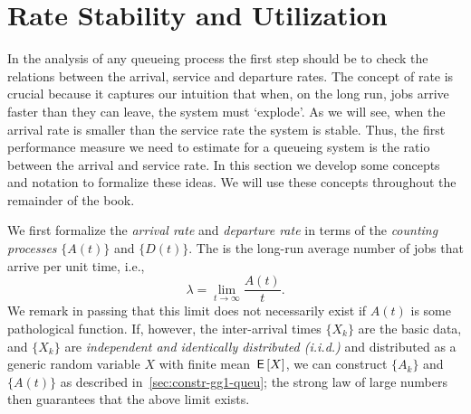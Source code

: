 \section{Rate Stability and Utilization}
\label{sec:rate-stability}



In the analysis of any queueing process the first step should be to check the relations between the arrival, service and departure rates.
The concept of rate is crucial because it captures our intuition that when, on the long run, jobs arrive faster than they can leave, the system must `explode'.
As we will see, when the arrival rate is smaller than the service rate the system is stable.
Thus, the first performance measure we need to estimate for a queueing system is the ratio between the arrival and service rate.
In this section we develop some concepts and notation to formalize these ideas.
We will use these concepts throughout the remainder of the book.

We first formalize the \emph{arrival rate} and \emph{departure rate} in terms of the \emph{counting processes} $\{A(t)\}$ and $\{D(t)\}$.
The  is the long-run average number of jobs that arrive per unit time, i.e.,
\begin{equation}
  \label{eq:3}
  \lambda = \lim_{t\to\infty} \frac{A(t)}t.
\end{equation}
We remark in passing that this limit does not necessarily exist if $A(t)$ is some pathological function.
If, however, the inter-arrival times $\{X_k\}$ are the basic data, and $\{X_k\}$ are \emph{independent and identically distributed (i.i.d.)}
and distributed as a generic random variable $X$ with finite mean $\,\mathsf{E}\left[X\right]$, we can construct $\{A_k\}$ and $\{A(t)\}$ as described in~\cref{sec:constr-gg1-queu}; the strong law of large numbers then guarantees that the above limit exists.

